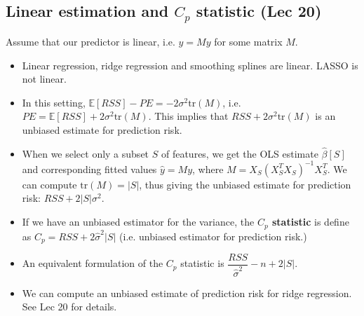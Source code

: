 \documentclass[twoside]{article}
\newcommand\bbE{\mathbb{E}}
\newcommand\sg{\sigma}
\begin{document}
\subsection{Linear estimation and $C_p$ statistic (Lec 20)}
Assume that our predictor is linear, i.e. $\hat{y} = My$ for some matrix $M$.
\begin{itemize}
\item Linear regression, ridge regression and smoothing splines are linear. LASSO is not linear.

\item In this setting, $\bbE [RSS] - PE = -2\sg^2 \text{tr}(M)$, i.e. $PE = \bbE [RSS] + 2\sg^2 \text{tr}(M)$. This implies that $RSS + 2\sg^2 \text{tr}(M)$ is an unbiased estimate for prediction risk.

\item When we select only a subset $S$ of features, we get the OLS estimate $\hat{\beta}[S]$ and corresponding fitted values $\hat{y} = My$, where $M = X_S(X_S^T X_S)^{-1}X_S^T$. We can compute $\text{tr}(M) = |S|$, thus giving the unbiased estimate for prediction risk: $RSS + 2|S|\sg^2$.

\item If we have an unbiased estimator for the variance, the \textbf{$C_p$ statistic} is define as $C_p = RSS + 2\hat{\sg}^2 |S|$ (i.e. unbiased estimator for prediction risk.)

\item An equivalent formulation of the $C_p$ statistic is $\dfrac{RSS}{\hat{\sg}^2} - n + 2|S|$.

\item We can compute an unbiased estimate of prediction risk for ridge regression. See Lec 20 for details.

\end{itemize}
\end{document}
